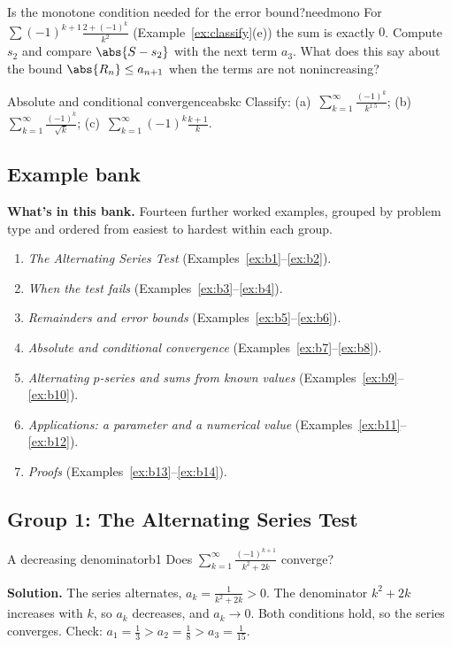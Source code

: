\documentclass[11pt]{article}
\begin{document}
\begin{think}{Is the monotone condition needed for the error bound?}{needmono}
For $\sum(-1)^{k+1}\frac{2+(-1)^k}{k^2}$ (Example~\ref{ex:classify}(e)) the sum is exactly $0$. Compute $s_2$ and compare $\abs{S-s_2}$ with the next term $a_3$. What does this say about the bound $\abs{R_n}\le a_{n+1}$ when the terms are not nonincreasing?
\end{think}

\begin{kc}{Absolute and conditional convergence}{abskc}
Classify: (a)~$\displaystyle\sum_{k=1}^\infty\frac{(-1)^k}{k^{1.5}}$; \quad (b)~$\displaystyle\sum_{k=1}^\infty\frac{(-1)^k}{\sqrt k}$; \quad (c)~$\displaystyle\sum_{k=1}^\infty(-1)^k\frac{k+1}k$.
\end{kc}

\subsection*{Example bank}

\textbf{What's in this bank.} Fourteen further worked examples, grouped by problem type and ordered from easiest to hardest within each group.
\begin{enumerate}[nosep]
  \item \emph{The Alternating Series Test} (Examples~\ref{ex:b1}--\ref{ex:b2}).
  \item \emph{When the test fails} (Examples~\ref{ex:b3}--\ref{ex:b4}).
  \item \emph{Remainders and error bounds} (Examples~\ref{ex:b5}--\ref{ex:b6}).
  \item \emph{Absolute and conditional convergence} (Examples~\ref{ex:b7}--\ref{ex:b8}).
  \item \emph{Alternating $p$-series and sums from known values} (Examples~\ref{ex:b9}--\ref{ex:b10}).
  \item \emph{Applications: a parameter and a numerical value} (Examples~\ref{ex:b11}--\ref{ex:b12}).
  \item \emph{Proofs} (Examples~\ref{ex:b13}--\ref{ex:b14}).
\end{enumerate}

\subsection*{Group 1: The Alternating Series Test}

\begin{exmp}{A decreasing denominator}{b1}
Does $\displaystyle\sum_{k=1}^\infty\frac{(-1)^{k+1}}{k^2+2k}$ converge?

\textbf{Solution.} The series alternates, $a_k=\frac1{k^2+2k}>0$. The denominator $k^2+2k$ increases with $k$, so $a_k$ decreases, and $a_k\to0$. Both conditions hold, so the series converges. Check: $a_1=\frac13>a_2=\frac18>a_3=\frac1{15}$.
\end{exmp}
\end{document}
